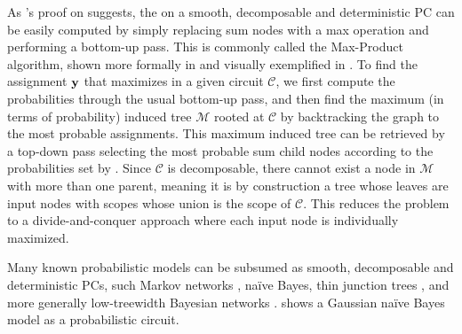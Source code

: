 As 's proof on  suggests, the \map{} on a smooth, decomposable
and deterministic PC can be easily computed by simply replacing sum nodes with a max operation and
performing a bottom-up \evi{} pass. This is commonly called the Max-Product algorithm, shown more
formally in  and visually exemplified in . To find the assignment
$\mathbf{y}$ that maximizes  in a given circuit $\mathcal{C}$, we first compute the
\map{} probabilities through the usual bottom-up pass, and then find the maximum (in terms of
probability) induced tree $\mathcal{M}$ rooted at $\mathcal{C}$ by backtracking the graph to the
most probable assignments. This maximum induced tree can be retrieved by a top-down pass selecting
the most probable sum child nodes according to the probabilities set by \map{}. Since $\mathcal{C}$
is decomposable, there cannot exist a node in $\mathcal{M}$ with more than one parent, meaning it
is by construction a tree whose leaves are input nodes with scopes whose union is the scope of
$\mathcal{C}$. This reduces the problem to a divide-and-conquer approach where each input node is
individually maximized.

Many known probabilistic models can be subsumed as smooth, decomposable and deterministic PCs, such
Markov networks \citep{lowd13a}, naïve Bayes, thin junction trees \citep{bach01}, and more
generally low-treewidth Bayesian networks \citep{darwiche03}.  shows a Gaussian
naïve Bayes model as a probabilistic circuit.

